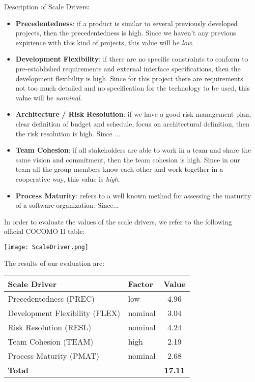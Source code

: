 Description of Scale Drivers:
\begin{itemize}
	\item \textbf{Precedentedness}: if a product is similar to several previously developed projects, then the precedentedness	is high. Since we haven't any previous expirience with this kind of projects, this value will be \textit{low}.
	\item \textbf{Development Flexibility}: if there are no specific constraints to conform to pre-established requirements and external interface specifications, then the development flexibility is high. Since for this project there are requirements not too much detailed and no specification for the technology to be used, this value will be \textit{nominal}.
	\item \textbf{Architecture / Risk Resolution}: if we have a good risk management plan, clear definition of budget and schedule, focus on architectural definition, then the risk resolution is high. Since ... \todo{}
	\item \textbf{Team Cohesion}: if all stakeholders are able to work in a team and share the same vision and commitment, then the team cohesion is high. Since in our team all the group members know each other and work together in a cooperative way, this value is \textit{high}.
	\item \textbf{Process Maturity}: refers to a well known method for assessing the maturity of a software organization. Since... \todo{}
\end{itemize}

In order to evaluate the values of the scale drivers, we refer to the following official COCOMO II table:
\begin{center}
	\texttt{[image: ScaleDriver.png]}
\end{center}

The results of our evaluation are:
\begin{center}
	\begin{tabular}{l l c}
		\hline
		\textbf{Scale Driver} & \textbf{Factor} & \textbf{Value} \\
		\hline
		Precedentedness (PREC) & low & 4.96 \\
		Development Flexibility (FLEX) & nominal & 3.04 \\
		Risk Resolution (RESL) & nominal & 4.24 \\
		Team Cohesion (TEAM) & high & 2.19 \\
		Process Maturity (PMAT) & nominal & 2.68 \\
		\hline
		\textbf{Total} & & \textbf{17.11} \\
		\hline
	\end{tabular}
\end{center}

